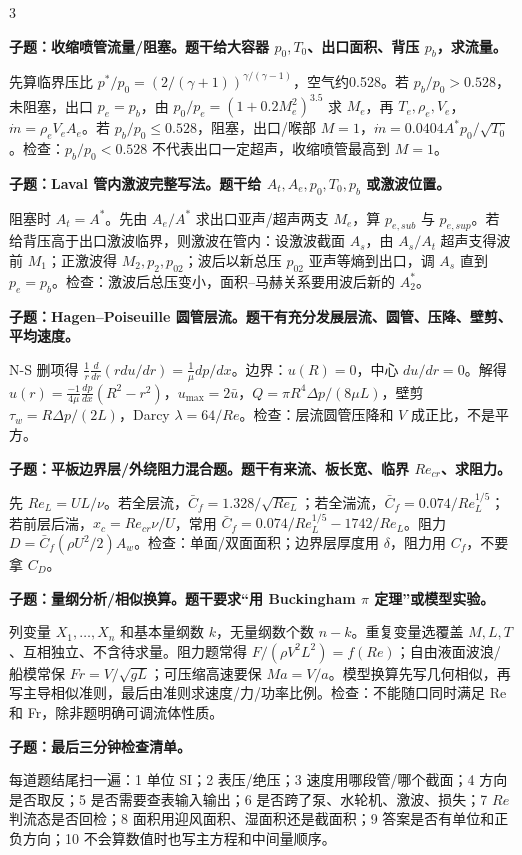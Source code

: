 \documentclass[a4paper]{article}
\newcommand{\qt}[1]{\vspace{0.04pt}\colorbox{Q}{\parbox{\dimexpr\linewidth-2\fboxsep}{\color{white}\bfseries #1}}\par}
\newcommand{\ans}[1]{\colorbox{G}{\parbox{\dimexpr\linewidth-2\fboxsep}{#1}}\par}
\begin{document}
\begin{multicols}{3}
\qt{子题：收缩喷管流量/阻塞。题干给大容器 $p_0,T_0$、出口面积、背压 $p_b$，求流量。}
\ans{先算临界压比 $p^*/p_0=(2/(\gamma+1))^{\gamma/(\gamma-1)}$，空气约0.528。若 $p_b/p_0>0.528$，未阻塞，出口 $p_e=p_b$，由 $p_0/p_e=(1+0.2M_e^2)^{3.5}$ 求 $M_e$，再 $T_e,\rho_e,V_e$，$\dot m=\rho_eV_eA_e$。若 $p_b/p_0\le0.528$，阻塞，出口/喉部 $M=1$，$\dot m=0.0404A^*p_0/\sqrt{T_0}$。检查：$p_b/p_0<0.528$ 不代表出口一定超声，收缩喷管最高到 $M=1$。}
\qt{子题：Laval 管内激波完整写法。题干给 $A_t,A_e,p_0,T_0,p_b$ 或激波位置。}
\ans{阻塞时 $A_t=A^*$。先由 $A_e/A^*$ 求出口亚声/超声两支 $M_e$，算 $p_{e,sub}$ 与 $p_{e,sup}$。若给背压高于出口激波临界，则激波在管内：设激波截面 $A_s$，由 $A_s/A_t$ 超声支得波前 $M_1$；正激波得 $M_2,p_2,p_{02}$；波后以新总压 $p_{02}$ 亚声等熵到出口，调 $A_s$ 直到 $p_e=p_b$。检查：激波后总压变小，面积--马赫关系要用波后新的 $A_2^*$。}
\qt{子题：Hagen--Poiseuille 圆管层流。题干有充分发展层流、圆管、压降、壁剪、平均速度。}
\ans{N-S 删项得 $\frac1r\frac d{dr}(rdu/dr)=\frac1\mu dp/dx$。边界：$u(R)=0$，中心 $du/dr=0$。解得 $u(r)=\frac{-1}{4\mu}\frac{dp}{dx}(R^2-r^2)$，$u_{\max}=2\bar u$，$Q=\pi R^4\Delta p/(8\mu L)$，壁剪 $\tau_w=R\Delta p/(2L)$，Darcy $\lambda=64/Re$。检查：层流圆管压降和 $V$ 成正比，不是平方。}
\qt{子题：平板边界层/外绕阻力混合题。题干有来流、板长宽、临界 $Re_{cr}$、求阻力。}
\ans{先 $Re_L=UL/\nu$。若全层流，$\bar C_f=1.328/\sqrt{Re_L}$；若全湍流，$\bar C_f=0.074/Re_L^{1/5}$；若前层后湍，$x_c=Re_{cr}\nu/U$，常用 $\bar C_f=0.074/Re_L^{1/5}-1742/Re_L$。阻力 $D=\bar C_f(\rho U^2/2)A_w$。检查：单面/双面面积；边界层厚度用 $\delta$，阻力用 $C_f$，不要拿 $C_D$。}
\qt{子题：量纲分析/相似换算。题干要求“用 Buckingham $\pi$ 定理”或模型实验。}
\ans{列变量 $X_1,\dots,X_n$ 和基本量纲数 $k$，无量纲数个数 $n-k$。重复变量选覆盖 $M,L,T$、互相独立、不含待求量。阻力题常得 $F/(\rho V^2L^2)=f(Re)$；自由液面波浪/船模常保 $Fr=V/\sqrt{gL}$；可压缩高速要保 $Ma=V/a$。模型换算先写几何相似，再写主导相似准则，最后由准则求速度/力/功率比例。检查：不能随口同时满足 Re 和 Fr，除非题明确可调流体性质。}
\qt{子题：最后三分钟检查清单。}
\ans{每道题结尾扫一遍：1 单位 SI；2 表压/绝压；3 速度用哪段管/哪个截面；4 方向是否取反；5 是否需要查表输入输出；6 是否跨了泵、水轮机、激波、损失；7 $Re$ 判流态是否回检；8 面积用迎风面积、湿面积还是截面积；9 答案是否有单位和正负方向；10 不会算数值时也写主方程和中间量顺序。}


\end{multicols}
\end{document}

